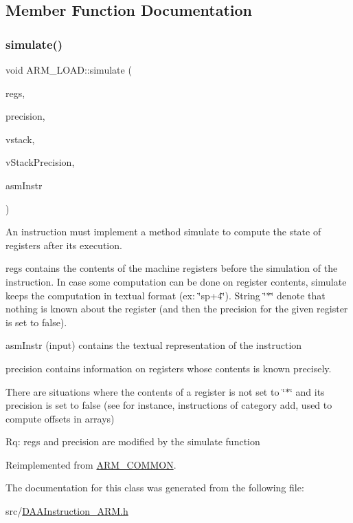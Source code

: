 \subsection{Member Function Documentation}
\mbox{\label{classARM__LOAD_a905a6e8a6154825f9dc739cabfdb148d}} 
\subsubsection{\texorpdfstring{simulate()}{simulate()}}
{\footnotesize\ttfamily void A\+R\+M\+\_\+\+L\+O\+A\+D\+::simulate (\begin{DoxyParamCaption}\item[{\hyperlink{DAAInstruction_8h_af0fae93a861de9cf37988d5673cac523}{reg\+Table} \&}]{regs,  }\item[{\hyperlink{DAAInstruction_8h_a0e8cae02815a5f8adc750122d790b455}{reg\+Precision\+Table} \&}]{precision,  }\item[{\hyperlink{DAAInstruction_8h_a1b0e70ac1a04f06c8132055ed01f589f}{stack\+Type} \&}]{vstack,  }\item[{\hyperlink{DAAInstruction_8h_ac5cb793e9dac3fa9693da78b7e29ab30}{stack\+Prec\+Type} \&}]{v\+Stack\+Precision,  }\item[{const string \&}]{asm\+Instr }\end{DoxyParamCaption})\hspace{0.3cm}{\ttfamily [virtual]}}

An instruction must implement a method simulate to compute the state of registers after its execution.

regs contains the contents of the machine registers before the simulation of the instruction. In case some computation can be done on register contents, simulate keeps the computation in textual format (ex\+: \char`\"{}sp+4\char`\"{}). String \char`\"{}$\ast$\char`\"{} denote that nothing is known about the register (and then the precision for the given register is set to false).

asm\+Instr (input) contains the textual representation of the instruction

precision contains information on registers whose contents is known precisely.

There are situations where the contents of a register is not set to \char`\"{}$\ast$\char`\"{} and its precision is set to false (see for instance, instructions of category add, used to compute offsets in arrays)

Rq\+: regs and precision are modified by the simulate function 

Reimplemented from \hyperlink{classARM__COMMON_a89eb552311ce787557a976aee2fa2db6}{A\+R\+M\+\_\+\+C\+O\+M\+M\+ON}.



The documentation for this class was generated from the following file\+:\begin{DoxyCompactItemize}
\item 
src/\hyperlink{DAAInstruction__ARM_8h}{D\+A\+A\+Instruction\+\_\+\+A\+R\+M.\+h}\end{DoxyCompactItemize}
